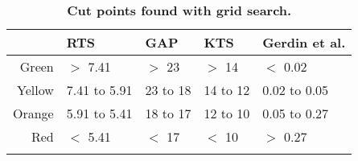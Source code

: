 \begin{table}[!ht]
\centering
\caption{\bf Cut points found with grid search.} 
\label{table:cut_points}
\begin{adjustbox}{max width = \linewidth} 
\begin{threeparttable} 
\begin{tabular} 
{rllll}
  \toprule
 & RTS & GAP & KTS & Gerdin et al. \\ 
  \midrule
Green & $>$ 7.41 & $>$ 23 & $>$ 14 & $<$ 0.02 \\ 
  Yellow & 7.41 to 5.91 & 23 to 18 & 14 to 12 & 0.02 to 0.05 \\ 
  Orange & 5.91 to 5.41 & 18 to 17 & 12 to 10 & 0.05 to 0.27 \\ 
  Red & $<$ 5.41 & $<$ 17 & $<$ 10 & $>$ 0.27 \\ 
   \bottomrule
\addlinespace 
\end{tabular} 
\end{threeparttable} 
\end{adjustbox}
\end{table}

